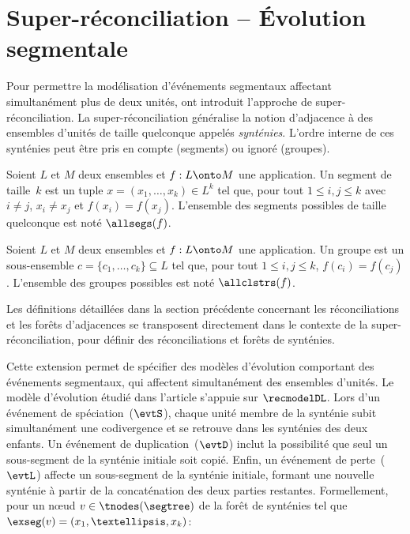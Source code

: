 \section{Super-réconciliation -- Évolution segmentale}

Pour permettre la modélisation d’événements segmentaux affectant simultanément plus de deux unités, \textcite{Delabre2020EvolutionSegmentalDuplications} ont introduit l’approche de super-réconciliation.
La super-réconciliation généralise la notion d’adjacence à des ensembles d’unités de taille quelconque appelés \emph{synténies}.
L’ordre interne de ces synténies peut être pris en compte (segments) ou ignoré (groupes).

\begin{definition}[Segment]\label{definition:seg}
    Soient \(L\) et \(M\) deux ensembles et \(f : L \onto M\) une application.
    Un segment de taille~\(k\) est un tuple \(x = (x_1, …, x_k) \in L^k\) tel que, pour tout \(1 \leq i, j \leq k\) avec \(i \neq j\), \(x_i \neq x_j\) et \(f(x_i) = f(x_j)\).
    L’ensemble des segments possibles de taille quelconque est noté \(\allsegs(f)\).
\end{definition}

\begin{definition}[Groupe]\label{definition:cluster}
    Soient \(L\) et \(M\) deux ensembles et \(f : L \onto M\) une application.
    Un groupe est un sous-ensemble \(c = \{c_1, …, c_k\} \subseteq L\) tel que, pour tout \(1 \leq i, j \leq k\), \(f(c_i) = f(c_j)\).
    L’ensemble des groupes possibles est noté \(\allclstrs(f)\).
\end{definition}

Les définitions détaillées dans la section précédente concernant les réconciliations et les forêts d’adjacences se transposent directement dans le contexte de la super-réconciliation, pour définir des réconciliations et forêts de synténies.

Cette extension permet de spécifier des modèles d’évolution comportant des événements segmentaux, qui affectent simultanément des ensembles d’unités.
Le modèle d’évolution étudié dans l’article s’appuie sur \(\recmodelDL\).
Lors d’un événement de spéciation~(\(\evtS\)), chaque unité membre de la synténie subit simultanément une codivergence et se retrouve dans les synténies des deux enfants.
Un événement de duplication~(\(\evtD\)) inclut la possibilité que seul un sous-segment de la synténie initiale soit copié.
Enfin, un événement de perte~(\(\evtL\)) affecte un sous-segment de la synténie initiale, formant une nouvelle synténie à partir de la concaténation des deux parties restantes.
Formellement, pour un nœud \(v \in \tnodes(\segtree)\) de la forêt de synténies tel que \(\exseg(v) = (x_1, …, x_k)\):

